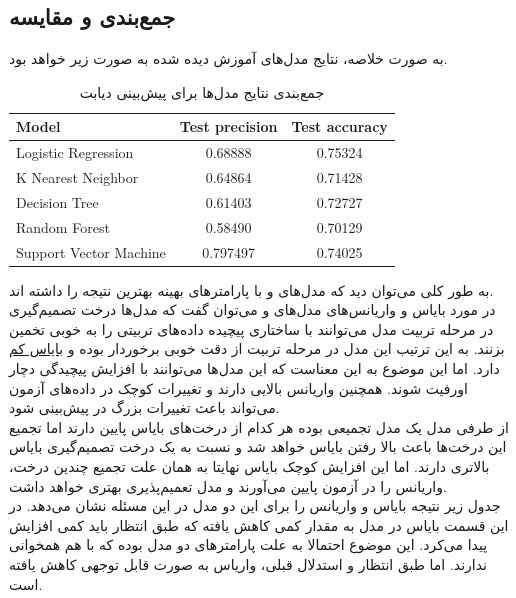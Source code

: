 \documentclass[11pt]{article}
\begin{document}
	\subsection{جمع‌بندی و مقایسه}
	به صورت خلاصه، نتایج مدل‌های آموزش دیده شده به صورت زیر خواهد بود.
			\begin{table}[h!]
		\caption{جمع‌بندی نتایج مدل‌ها برای پیش‌بینی دیابت}
		\begin{latin}
			\centering
			\begin{tabular}{|l|c|c|}
				\hline
				\textbf{Model} & \textbf{Test precision} & \textbf{Test accuracy} \\ \hline
				Logistic Regression & 0.68888 & 0.75324 \\ \hline
				K Nearest Neighbor & 0.64864 & 0.71428 \\ \hline
				Decision Tree & 0.61403 & 0.72727 \\ \hline
				Random Forest & 0.58490 & 0.70129 \\ \hline
				Support Vector Machine & 0.797497 & 0.74025 \\ \hline
			\end{tabular}
		\end{latin}
		\label{tab:results2} 
		\end{table}
		به طور کلی می‌توان دید که مدل‌های  و  با پارامتر‌های بهینه بهترین نتیجه را داشته اند.\\
		در مورد بایاس و واریانس‌های مدل‌های  و  می‌توان گفت که مدل‌ها درخت تصمیم‌گیری در مرحله تربیت مدل می‌توانند با ساختاری پیچیده داده‌های تربیتی را به خوبی تخمین بزنند. به این ترتیب این مدل در مرحله تربیت از دقت خوبی برخوردار بوده و \underline{بایاس کم} دارد. اما این موضوع به این معناست که این مدل‌ها می‌توانند با افزایش پیچیدگی دچار اورفیت شوند. همچنین واریانس بالایی دارند و تغییرات کوچک در داده‌های آزمون می‌تواند باعث تغییرات بزرگ در پیش‌بینی شود.\\
		از طرفی مدل‌
		یک مدل تجمیعی بوده هر کدام از درخت‌های بایاس پایین دارند اما تجمیع این درخت‌ها باعث بالا رفتن بایاس خواهد شد و نسبت به یک درخت تصمیم‌گیری بایاس بالاتری دارند. اما این افزایش کوچک بایاس نهایتا به همان علت تجمیع چندین درخت، واریانس را در آزمون پایین می‌آورند و مدل تعمیم‌پذیری بهتری خواهد داشت.\\
		جدول زیر نتیجه بایاس و واریانس را برای این دو مدل در این مسئله نشان می‌دهد. در این قسمت بایاس در مدل  به مقدار کمی کاهش یافته که طبق انتظار باید کمی افزایش پیدا می‌کرد. این موضوع احتمالا به علت پارامتر‌های دو مدل بوده که با هم همخوانی ندارند. اما طبق انتظار و استدلال قبلی، واریاس به صورت قابل توجهی کاهش یافته است.
\end{document}
